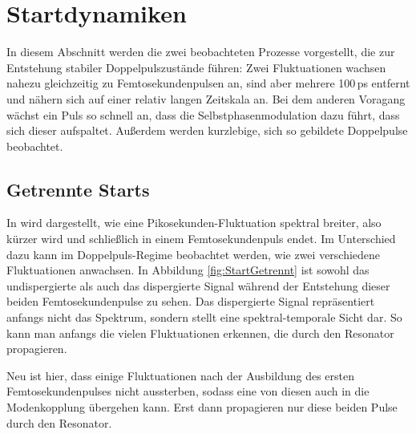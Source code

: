 \documentclass[bachelor,       %
               twoside,        %
               BCOR10mm,       %
               liststotoc,nomtotoc,bibtotoc, %
               english,ngerman, %
               final,          %
               ]{GAUBM}
\begin{document}
\clearpage

\section{Startdynamiken}
\label{sec:start}
In diesem Abschnitt werden die zwei beobachteten Prozesse vorgestellt, die zur Entstehung stabiler Doppelpulszustände führen:
Zwei Fluktuationen wachsen nahezu gleichzeitig zu Femtosekundenpulsen an, sind aber mehrere 100\,ps entfernt und nähern sich auf einer relativ langen Zeitskala an.
Bei dem anderen Voragang wächst ein Puls so schnell an, dass die Selbstphasenmodulation dazu führt, dass sich dieser aufspaltet.
Außerdem werden kurzlebige, sich so gebildete Doppelpulse beobachtet.

\subsection{Getrennte Starts}
In \cite{herink_resolving_2016} wird dargestellt, wie eine Pikosekunden-Fluktuation  spektral breiter, also kürzer wird und schließlich in einem Femtosekundenpuls endet.
Im Unterschied dazu kann im Doppelpuls-Regime beobachtet werden, wie zwei verschiedene Fluktuationen anwachsen.
In Abbildung \ref{fig:StartGetrennt} ist sowohl das undispergierte als auch das dispergierte Signal während der Entstehung dieser beiden Femtosekundenpulse zu sehen.
Das dispergierte Signal repräsentiert anfangs nicht das Spektrum, sondern stellt eine spektral-temporale Sicht dar.
So kann man anfangs die vielen Fluktuationen erkennen, die durch den Resonator propagieren.

Neu ist hier, dass einige Fluktuationen nach der Ausbildung des ersten Femtosekundenpulses nicht aussterben, sodass eine von diesen auch in die Modenkopplung übergehen kann.
Erst dann propagieren nur diese beiden Pulse durch den Resonator.
\end{document}
